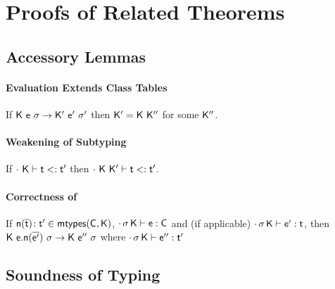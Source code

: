 \documentclass[a4paper,USenglish]{tex/lipics-v2016}
\begin{document}



\section{Proofs of Related Theorems}
\subsection{Accessory Lemmas}

\paragraph{Evaluation Extends Class Tables}

If $\Reduce \K\e\s \Kp\ep\sp$ then $\Kp = \K~\Kpp$ for some $\Kpp$.

\paragraph{Weakening of Subtyping}

If $\StrSub\cdot\K\t\tp$ then $\StrSub\cdot{\K~\Kp}\t\tp$.

\paragraph{Correctness of \classoff{\C}{\K}}

If $\Mtype\n{\b\t}\tp \in \classoff{\C}{\K}$, $\EnvType\cdot\s\K\e\C$ and (if applicable) $\EnvType\cdot\s\K\ep\t$, then $\Reduce \K{\Call\e\n{\b\ep}}\s \K\epp\s$ where $\EnvType\cdot\s\K\epp\tp$

\subsection{Soundness of \name Typing}
\end{document}
